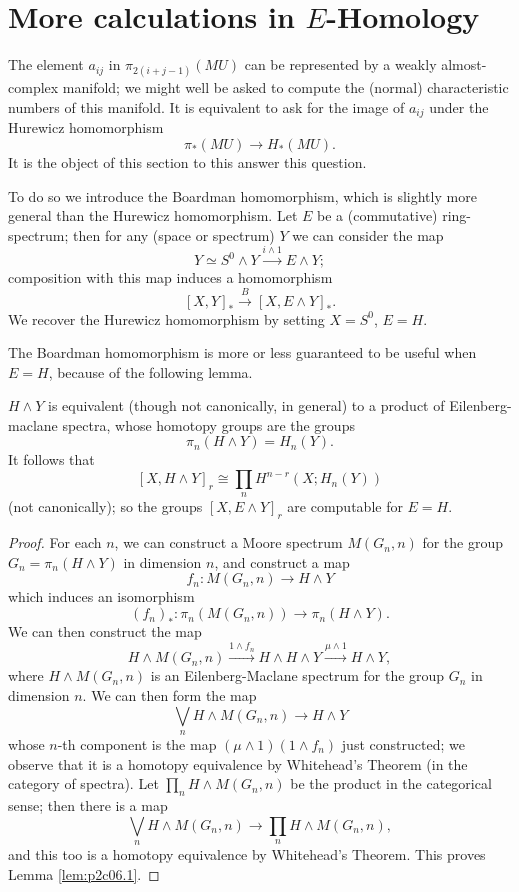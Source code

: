 \documentclass[../main]{subfiles}
\begin{document}
\label{sec:p2c6}
\renewcommand{\labelenumi}{(\roman{enumi})}

\chapter{More calculations in $E$-Homology}
The element $a_{ij}$ in $\pi_{2(i+j-1)}(MU)$ can be represented by a weakly almost-complex manifold; we might well be asked to compute the (normal) characteristic numbers of this manifold. It is equivalent to ask for the image of $a_{ij}$ under the Hurewicz homomorphism
$$\pi_\ast(MU)\longrightarrow H_\ast(MU).$$
It is the object of this section to this answer this question.

To do so we introduce the Boardman homomorphism, which is slightly more general than the Hurewicz homomorphism. Let $E$ be a (commutative) ring-spectrum; then for any (space or spectrum) $Y$ we can consider the map 
$$Y\simeq S^0\wedge Y\overset{i\wedge 1}{\longrightarrow} E\wedge Y;$$
composition with this map induces a homomorphism 
$$[X,Y]_\ast\overset{B}{\longrightarrow}[X,E\wedge Y]_\ast.$$
We recover the Hurewicz homomorphism by setting $X=S^0$, $E=H$. 

The Boardman homomorphism is more or less guaranteed to be useful when $E=H$, because of the following lemma.
\begin{lemma}
\label{lem:p2c06.1}
$H\wedge Y$ is equivalent (though not canonically, in general) to a product of Eilenberg-maclane spectra, whose homotopy groups are the groups
$$\pi_n(H\wedge Y)=H_n(Y).$$
It follows that 
$$[X,H\wedge Y]_r \cong \prod_n H^{n-r}(X;H_n(Y))$$
(not canonically); so the groups $[X,E\wedge Y]_r$ are computable for $E=H$.
\end{lemma}
\begin{proof}
For each $n$, we can construct a Moore spectrum $M(G_n,n)$ for the group $G_n=\pi_n(H\wedge Y)$ in dimension $n$, and construct a map 
$$f_n:M(G_n,n)\longrightarrow H\wedge Y$$
which induces an isomorphism
$$(f_n)_\ast:\pi_n(M(G_n,n))\longrightarrow \pi_n(H\wedge Y).$$
We can then construct the map
$$H\wedge M(G_n,n)\overset{1\wedge f_n}{\longrightarrow} H\wedge H\wedge Y \overset{\mu\wedge 1}{\longrightarrow} H\wedge Y,$$
where $H\wedge M(G_n,n)$ is an Eilenberg-Maclane spectrum for the group $G_n$ in dimension $n$. We can then form the map
$$\bigvee_n H\wedge M(G_n,n)\longrightarrow H\wedge Y$$
whose $n$-th component is the map $(\mu\wedge 1)(1\wedge f_n)$ just constructed; we observe that it is a homotopy equivalence by Whitehead's Theorem (in the category of spectra). Let $\prod_n H\wedge M(G_n,n)$ be the product in the categorical sense; then there is a map 
$$\bigvee_n H\wedge M(G_n,n)\longrightarrow \prod_n H\wedge M(G_n,n),$$
and this too is a homotopy equivalence by Whitehead's Theorem. This proves Lemma \ref{lem:p2c06.1}.
\end{proof}
\end{document}
